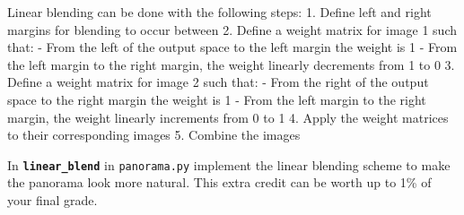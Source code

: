 \documentclass[11pt]{article}
\begin{document}
Linear blending can be done with the following steps: 1. Define left and
right margins for blending to occur between 2. Define a weight matrix
for image 1 such that: - From the left of the output space to the left
margin the weight is 1 - From the left margin to the right margin, the
weight linearly decrements from 1 to 0 3. Define a weight matrix for
image 2 such that: - From the right of the output space to the right
margin the weight is 1 - From the left margin to the right margin, the
weight linearly increments from 0 to 1 4. Apply the weight matrices to
their corresponding images 5. Combine the images

In \textbf{\texttt{linear\_blend}} in \texttt{panorama.py} implement the
linear blending scheme to make the panorama look more natural. This
extra credit can be worth up to 1\% of your final grade.
\end{document}
